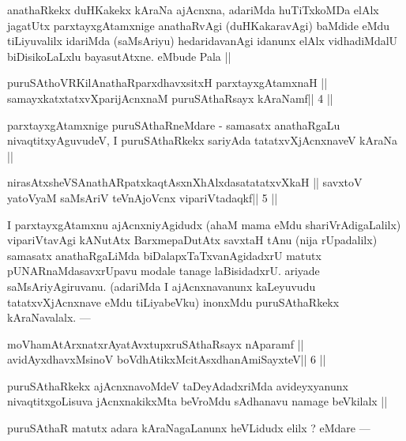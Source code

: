\begin{artha}
anathaRkekx duHKakekx kAraNa ajAcnxna, adariMda huTiTxkoMDa elAlx jagatUtx parxtayxgAtamxnige anathaRvAgi (duHKakaravAgi) baMdide eMdu tiLiyuvalilx idariMda (saMsAriyu) hedaridavanAgi idanunx elAlx vidhadiMdalU biDisikoLaLxlu bayasutAtxne. eMbude Pala ||
\end{artha}

\begin{shl}
puruSAthoVR\s KilAnathaRparxdhavxsitxH parxtayxgAtamxnaH ||
samayxkatxtatxvXparijAcnxnaM puruSAthaRsayx kAraNamf\hfill || 4 ||
\end{shl}

\begin{artha}
parxtayxgAtamxnige puruSAthaRneMdare - samasatx anathaRgaLu nivaqtitxyAguvudeV, I puruSAthaRkekx sariyAda tatatxvXjAcnxnaveV kAraNa ||
\end{artha}


\begin{shl}
nirasAtxsheVSAnathARpatxkaqtAsxnXhAlxdasatatatxvXkaH ||
savxtoV yatoV\s yaM saMsAriV teVnAjoVcnx vipariVtadaqkf\hfill || 5 ||
\end{shl}

\begin{artha}
I parxtayxgAtamxnu ajAcnxniyAgidudx (ahaM mama eMdu shariVrAdigaLalilx) vipariVtavAgi kANutAtx BarxmepaDutAtx savxtaH tAnu (nija rUpadalilx) samasatx anathaRgaLiMda biDalapxTaTxvanAgidadxrU matutx pUNARnaMdasavxrUpavu modale tanage laBisidadxrU. ariyade saMsAriyAgiruvanu. (adariMda I ajAcnxnavanunx kaLeyuvudu tatatxvXjAcnxnave eMdu tiLiyabeVku) inonxMdu puruSAthaRkekx kAraNavalalx. ---
\end{artha}

\begin{shl}
moVhamAtArxnatxrAyatAvxtupxruSAthaRsayx nAparamf ||
avidAyxdhavxMsinoV boVdhAtikxMcitAsxdhanAmiSayxteV\hfill || 6 ||
\end{shl}

\begin{artha}
puruSAthaRkekx ajAcnxnavoMdeV taDeyAdadxriMda avideyxyanunx nivaqtitxgoLisuva jAcnxnakikxMta beVroMdu sAdhanavu namage beVkilalx ||
\end{artha}

\begin{artha}
puruSAthaR matutx adara kAraNagaLanunx heVLidudx elilx ? eMdare ---
\end{artha} 

